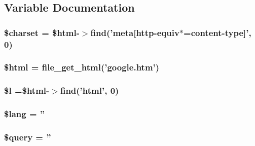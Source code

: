 \subsection{Variable Documentation}
\hypertarget{parser_2app_2index_8php_af10158dd74b75f1d337e83102d6b82ce}{
\subsubsection[{\$charset}]{\setlength{\rightskip}{0pt plus 5cm}\$charset = \$html-\/$>$find('meta\mbox{[}http-\/equiv$\ast$=content-\/{\bf type}\mbox{]}', 0)}}\label{parser_2app_2index_8php_af10158dd74b75f1d337e83102d6b82ce}
\hypertarget{parser_2app_2index_8php_a6f96e7fc92441776c9d1cd3386663b40}{
\subsubsection[{\$html}]{\setlength{\rightskip}{0pt plus 5cm}\$html = {\bf file\+\_\+get\+\_\+html}('google.\+htm')}}\label{parser_2app_2index_8php_a6f96e7fc92441776c9d1cd3386663b40}
\hypertarget{parser_2app_2index_8php_a3fc62fd062300c58c188533cbe23e1e5}{
\subsubsection[{\$l}]{\setlength{\rightskip}{0pt plus 5cm}\$l =\$html-\/$>$find('html', 0)}}\label{parser_2app_2index_8php_a3fc62fd062300c58c188533cbe23e1e5}
\hypertarget{parser_2app_2index_8php_a7714b111b644017933931ec69a154102}{
\subsubsection[{\$lang}]{\setlength{\rightskip}{0pt plus 5cm}\$lang = ''}}\label{parser_2app_2index_8php_a7714b111b644017933931ec69a154102}
\hypertarget{parser_2app_2index_8php_af59a5f7cd609e592c41dc3643efd3c98}{
\subsubsection[{\$query}]{\setlength{\rightskip}{0pt plus 5cm}\$query = ''}}\label{parser_2app_2index_8php_af59a5f7cd609e592c41dc3643efd3c98}
